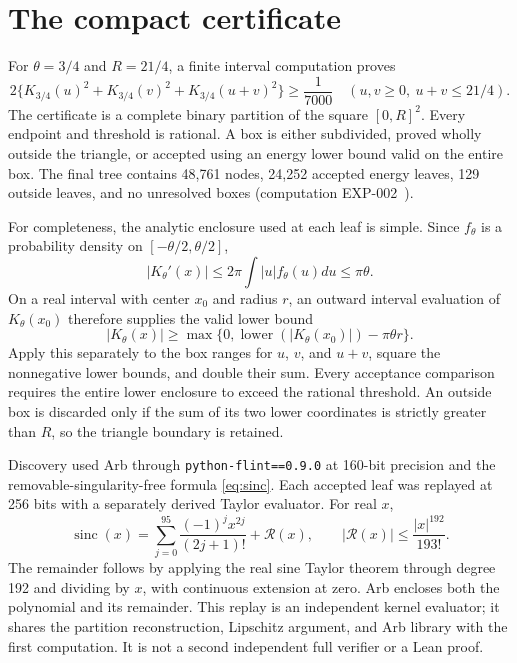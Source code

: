 \documentclass[11pt]{article}
\theoremstyle{remark}
\begin{document}
\section{The compact certificate}\label{sec:certificate}

For $\theta=3/4$ and $R=21/4$, a finite interval computation proves
\begin{equation}\label{eq:numericalgap}
 2\{K_{3/4}(u)^2+K_{3/4}(v)^2+K_{3/4}(u+v)^2\}\ge\frac1{7000}
 \quad(u,v\ge0,\ u+v\le21/4).
\end{equation}
The certificate is a complete binary partition of the square $[0,R]^2$.
Every endpoint and threshold is rational. A box is either subdivided,
proved wholly outside the triangle, or accepted using an energy lower
bound valid on the entire box. The final tree contains 48,761 nodes,
24,252 accepted energy leaves, 129 outside leaves, and no unresolved
boxes (computation EXP-002~\cite{Record}).

For completeness, the analytic enclosure used at each leaf is simple.
Since $f_\theta$ is a probability density on $[-\theta/2,\theta/2]$,
\begin{equation}\label{eq:lipschitz}
 |K_\theta'(x)|\le2\pi\int|u|f_\theta(u)du\le\pi\theta.
\end{equation}
On a real interval with center $x_0$ and radius $r$, an outward interval
evaluation of $K_\theta(x_0)$ therefore supplies the valid lower bound
\[
 |K_\theta(x)|\ge
 \max\{0,\operatorname{lower}(|K_\theta(x_0)|)-\pi\theta r\}.
\]
Apply this separately to the box ranges for $u$, $v$, and $u+v$, square
the nonnegative lower bounds, and double their sum. Every acceptance
comparison requires the entire lower enclosure to exceed the rational
threshold. An outside box is discarded only if the sum of its two lower
coordinates is strictly greater than $R$, so the triangle boundary is
retained.

Discovery used Arb through \texttt{python-flint==0.9.0} at 160-bit
precision and the removable-singularity-free formula \eqref{eq:sinc}.
Each accepted leaf was replayed at 256 bits with a separately derived
Taylor evaluator. For real $x$,
\begin{equation}\label{eq:taylor}
 \operatorname{sinc}(x)=\sum_{j=0}^{95}\frac{(-1)^jx^{2j}}{(2j+1)!}
 +\mathcal R(x),\qquad
 |\mathcal R(x)|\le\frac{|x|^{192}}{193!}.
\end{equation}
The remainder follows by applying the real sine Taylor theorem through
degree 192 and dividing by $x$, with continuous extension at zero.
Arb encloses both the polynomial and its remainder. This replay is an
independent kernel evaluator; it shares the partition reconstruction,
Lipschitz argument, and Arb library with the first computation. It is
not a second independent full verifier or a Lean proof.
\end{document}
